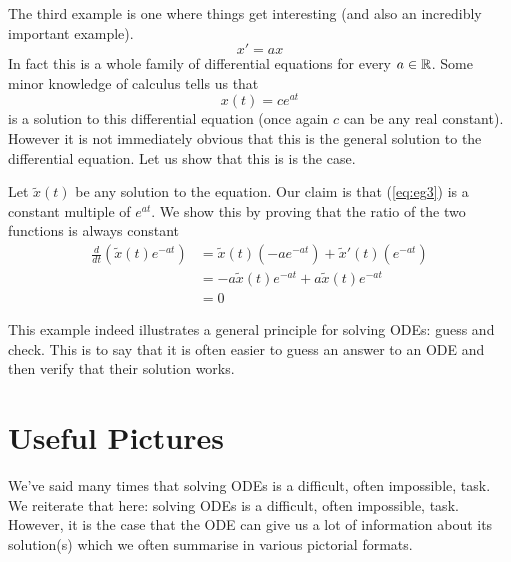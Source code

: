 The third example is one where things get interesting (and also an incredibly important example).
\begin{equation}\label{eq:eg3}
    x' = ax
\end{equation}
In fact this is a whole family of differential equations for every $a \in \mathbb{R}$. Some minor knowledge of calculus tells us that
$$ x(t) = ce^{at} $$
is a solution to this differential equation (once again $c$ can be any real constant). However it is not immediately obvious that this is the general solution to the differential equation. Let us show that this is is the case.

Let $\tilde{x}(t)$ be any solution to the equation. Our claim is that (\ref*{eq:eg3}) is a constant multiple of $e^{at}$. We show this by proving that the ratio of the two functions is always constant
\begin{align*}
    \frac{d}{dt}(\tilde{x}(t) e^{-at}) &= \tilde{x}(t)(-a e^{-at}) + \tilde{x}'(t)(e^{-at})\\
    &= -a \tilde{x}(t) e^{-at} + a \tilde{x}(t) e^{-at}\\
    &= 0
\end{align*}

This example indeed illustrates a general principle for solving ODEs: guess and check. This is to say that it is often easier to guess an answer to an ODE and then verify that their solution works. 

\section{Useful Pictures}
We've said many times that solving ODEs is a difficult, often impossible, task. We reiterate that here: solving ODEs is a difficult, often impossible, task. However, it is the case that the ODE can give us a lot of information about its solution(s) which we often summarise in various pictorial formats.

